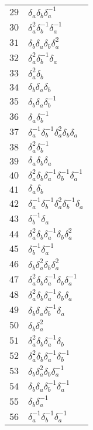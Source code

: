 \documentclass{article}
\begin{document}
\begin{center}
\begin{tabular}{ll}
$29$ & $\delta_a^{}\delta_b^{}\delta_a^{-1}$ \\
$30$ & $\delta_a^{2}\delta_b^{-1}\delta_a^{-1}$ \\
$31$ & $\delta_b^{}\delta_a^{}\delta_b^{}\delta_a^{2}$ \\
$32$ & $\delta_a^{2}\delta_b^{-1}\delta_a^{}$ \\
$33$ & $\delta_a^{2}\delta_b^{}$ \\
$34$ & $\delta_b^{}\delta_a^{}\delta_b^{}$ \\
$35$ & $\delta_b^{}\delta_a^{}\delta_b^{-1}$ \\
$36$ & $\delta_a^{}\delta_b^{-1}$ \\
$37$ & $\delta_a^{-1}\delta_b^{-1}\delta_a^{2}\delta_b^{}\delta_a^{}$ \\
$38$ & $\delta_a^{2}\delta_b^{-1}$ \\
$39$ & $\delta_a^{}\delta_b^{}\delta_a^{}$ \\
$40$ & $\delta_a^{2}\delta_b^{}\delta_a^{-1}\delta_b^{-1}\delta_a^{-1}$ \\
$41$ & $\delta_a^{}\delta_b^{}$ \\
$42$ & $\delta_a^{-1}\delta_b^{-1}\delta_a^{2}\delta_b^{-1}\delta_a^{}$ \\
$43$ & $\delta_b^{-1}\delta_a^{}$ \\
$44$ & $\delta_a^{2}\delta_b^{}\delta_a^{-1}\delta_b^{}\delta_a^{2}$ \\
$45$ & $\delta_b^{-1}\delta_a^{-1}$ \\
$46$ & $\delta_b^{}\delta_a^{2}\delta_b^{}\delta_a^{2}$ \\
$47$ & $\delta_a^{2}\delta_b^{}\delta_a^{-1}\delta_b^{}\delta_a^{-1}$ \\
$48$ & $\delta_a^{2}\delta_b^{}\delta_a^{-1}\delta_b^{}\delta_a^{}$ \\
$49$ & $\delta_b^{}\delta_a^{}\delta_b^{-1}\delta_a^{}$ \\
$50$ & $\delta_b^{}\delta_a^{2}$ \\
$51$ & $\delta_a^{2}\delta_b^{}\delta_a^{-1}\delta_b^{}$ \\
$52$ & $\delta_a^{2}\delta_b^{}\delta_a^{-1}\delta_b^{-1}$ \\
$53$ & $\delta_b^{}\delta_a^{2}\delta_b^{}\delta_a^{-1}$ \\
$54$ & $\delta_b^{}\delta_a^{}\delta_b^{-1}\delta_a^{-1}$ \\
$55$ & $\delta_b^{}\delta_a^{-1}$ \\
$56$ & $\delta_a^{-1}\delta_b^{-1}\delta_a^{-1}$ \\

\end{tabular}
\end{center}
\end{document}
